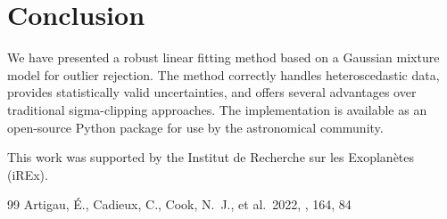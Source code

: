 \documentclass[twocolumn]{aastex631}
\begin{document}
\section{Conclusion}
\label{sec:conclusion}

We have presented a robust linear fitting method based on a Gaussian mixture model
for outlier rejection. The method correctly handles heteroscedastic data, provides
statistically valid uncertainties, and offers several advantages over traditional
sigma-clipping approaches. The implementation is available as an open-source Python
package for use by the astronomical community.


\acknowledgments

This work was supported by the Institut de Recherche sur les Exoplan\`etes (iREx).


\begin{thebibliography}{99}
Artigau, \'E., Cadieux, C., Cook, N.~J., et al.\ 2022, \aj, 164, 84
\end{thebibliography}
\end{document}
